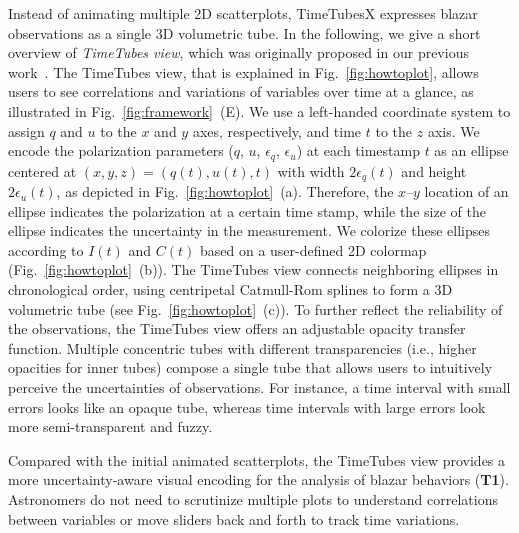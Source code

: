 Instead of animating multiple 2D scatterplots,
TimeTubesX expresses blazar observations as a single 3D volumetric tube. 
In the following, we give a short overview of \emph{TimeTubes view}, which was originally proposed in our previous work~\cite{Fujishiro2018}.
The TimeTubes view, that is explained in Fig.~\ref{fig:howtoplot}, allows users to see correlations and variations of variables over time at a glance, as illustrated in Fig.~\ref{fig:framework}~(E).
%
We use a left-handed coordinate system to assign $q$ and $u$ to the $x$ and $y$ axes, respectively, and time $t$ to the $z$ axis.
We encode the polarization parameters ($q$, $u$, $\epsilon_q$, $\epsilon_u$) at each timestamp $t$ as an ellipse centered at $(x, y, z) = (q(t), u(t), t)$ with width $2\epsilon_q(t)$ and height $2\epsilon_u(t)$, as depicted in Fig.~\ref{fig:howtoplot}~(a). 
Therefore, the $x$--$y$ location of an ellipse indicates the polarization at a certain time stamp, while the size of the ellipse indicates the uncertainty in the measurement.
%
We colorize these ellipses according to $I(t)$ and $C(t)$ based on a user-defined 2D colormap (Fig.~\ref{fig:howtoplot}~(b)). 
The TimeTubes view connects neighboring ellipses in chronological order, using centripetal Catmull-Rom splines to form a 3D volumetric tube (see Fig.~\ref{fig:howtoplot}~(c)). 
To further reflect the reliability of the observations, the TimeTubes view offers an adjustable opacity transfer function.
Multiple concentric tubes with different transparencies (i.e., higher opacities for inner tubes) compose a single tube that allows users to intuitively perceive the uncertainties of observations.
For instance, a time interval with small errors looks like an opaque tube, whereas time intervals with large errors look more semi-transparent and fuzzy.

Compared with the initial animated scatterplots,
the TimeTubes view provides a more uncertainty-aware visual encoding for the analysis of blazar behaviors (\textbf{T1}).
Astronomers do not need to scrutinize multiple plots to understand correlations between variables
or move sliders back and forth %
to track time variations.

%

